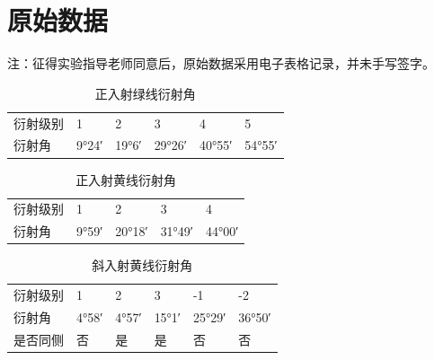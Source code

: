 \documentclass[UTF8,a4paper]{article}%
\begin{document}
\section{原始数据}
注：征得实验指导老师同意后，原始数据采用电子表格记录，并未手写签字。
\begin{table}[H]
    \centering
    \caption{正入射绿线衍射角}
    \label{tab:lab1}
    \begin{tabular}{llllll}
        \hline
        衍射级别 & 1          & 2          & 3           & 4           & 5           \\
        衍射角  & \ang{9;24} & \ang{19;6} & \ang{29;26} & \ang{40;55} & \ang{54;55} \\ \hline
    \end{tabular}
\end{table}
\begin{table}[H]
    \centering
    \caption{正入射黄线衍射角}
    \label{tab:lab2}
    \begin{tabular}{lllll}
        \hline
        衍射级别 & 1          & 2           & 3           & 4           \\
        衍射角  & \ang{9;59} & \ang{20;18} & \ang{31;49} & \ang{44;00} \\ \hline
    \end{tabular}
\end{table}
\begin{table}[H]
    \centering
    \caption{斜入射黄线衍射角}
    \label{tab:lab3}
    \begin{tabular}{llllll}
        \hline
        衍射级别 & 1          & 2          & 3          & -1          & -2          \\
        衍射角  & \ang{4;58} & \ang{4;57} & \ang{15;1} & \ang{25;29} & \ang{36;50} \\
        是否同侧 & 否          & 是          & 是          & 否           & 否           \\\hline
    \end{tabular}
\end{table}
\end{document}
